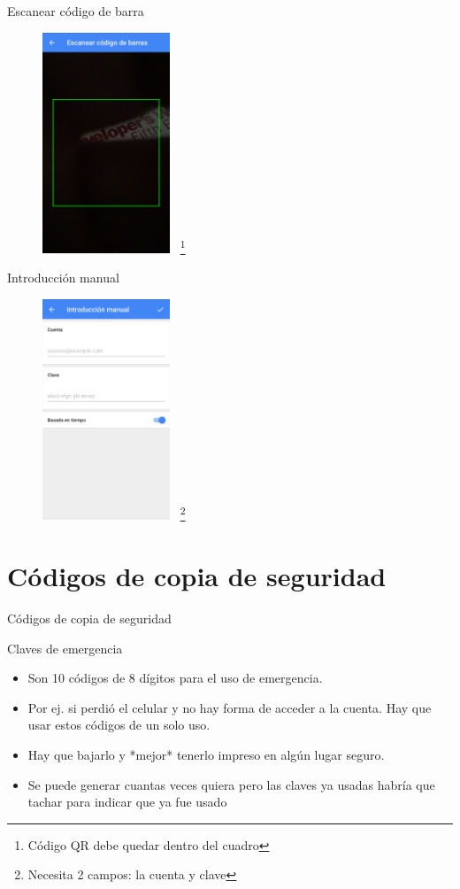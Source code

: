 \documentclass[11pt]{beamer}
\let\oldfootnote\footnote
\renewcommand\footnote[1][]{\oldfootnote[frame,#1]}
\begin{document}
\begin{frame}{Escanear c\'odigo de barra}
  \begin{figure}
    \includegraphics[width=1.5in]{images/escanear.png}
      ~\footnote{C\'odigo QR debe quedar dentro del cuadro}
  \end{figure}
\end{frame}
\begin{frame}{Introducci\'on manual}
  \begin{figure}
    \includegraphics[width=1.5in]{images/manual.png}
      ~\footnote{Necesita 2 campos: la cuenta y clave}
  \end{figure}
\end{frame}
\section{C\'odigos de copia de seguridad}
\begin{frame}{C\'odigos de copia de seguridad}
  \begin{block}{Claves de emergencia}
    \begin{itemize}
      \item Son 10 c\'odigos de 8 d\'igitos para el uso de emergencia.
      \item Por ej. si perdi\'o el celular y no hay forma de acceder a la cuenta. Hay que usar estos c\'odigos de un solo uso. 
      \item Hay que bajarlo y *mejor* tenerlo impreso en alg\'un lugar seguro.
      \item Se puede generar cuantas veces quiera pero las claves ya usadas habr\'ia que tachar para indicar que ya fue usado
    \end{itemize}
  \end{block}
\end{frame}
\end{document}

